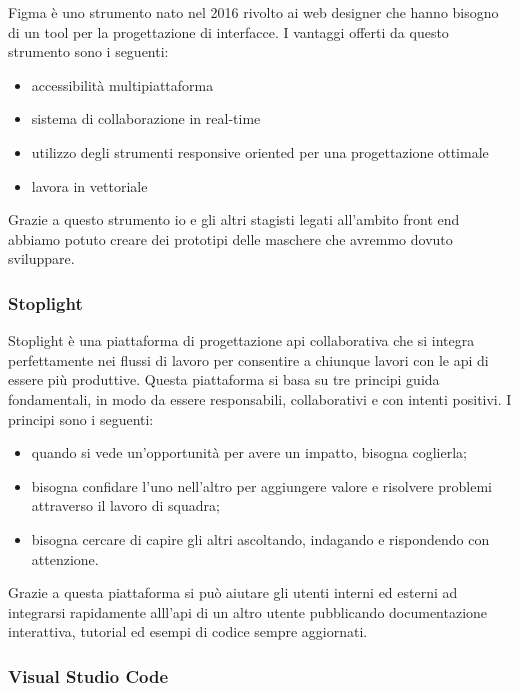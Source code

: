Figma è uno strumento nato nel 2016 rivolto ai web designer che hanno bisogno di un tool per la progettazione di interfacce. I vantaggi offerti da questo strumento sono i seguenti:
\begin{itemize}
	\item accessibilità multipiattaforma
	\item sistema di collaborazione in real-time
	\item utilizzo degli strumenti responsive oriented per una progettazione ottimale
	\item lavora in vettoriale
\end{itemize}
Grazie a questo strumento io e gli altri stagisti legati all'ambito front end abbiamo potuto creare dei prototipi delle maschere che avremmo dovuto sviluppare.

\subsubsection{Stoplight}

Stoplight è una piattaforma di progettazione \gls{api} collaborativa che si integra perfettamente nei flussi di lavoro per consentire a chiunque lavori con le \gls{api} di essere più produttive. Questa piattaforma si basa su tre principi guida fondamentali, in modo da essere responsabili, collaborativi e con intenti positivi. I principi sono i seguenti:
\begin{itemize}
	\item quando si vede un'opportunità per avere un impatto, bisogna coglierla;
	\item bisogna confidare l'uno nell'altro per aggiungere valore e risolvere problemi attraverso il lavoro di squadra;
	\item bisogna cercare di capire gli altri ascoltando, indagando e rispondendo con attenzione.
\end{itemize}
Grazie a questa piattaforma si può aiutare gli utenti interni ed esterni ad integrarsi rapidamente alll'\gls{api} di un altro utente pubblicando documentazione interattiva, tutorial ed esempi di codice sempre aggiornati.

\subsubsection{Visual Studio Code}

